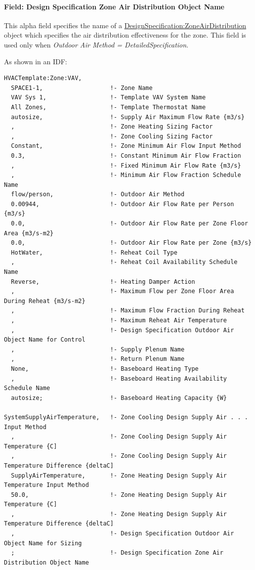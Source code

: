 \paragraph{Field: Design Specification Zone Air Distribution Object Name}\label{field-design-specification-zone-air-distribution-object-name-7}

This alpha field specifies the name of a \hyperref[designspecificationzoneairdistribution]{DesignSpecification:ZoneAirDistribution} object which specifies the air distribution effectiveness for the zone. This field is used only when \emph{Outdoor Air Method = DetailedSpecification}.

As shown in an IDF:

\begin{lstlisting}
HVACTemplate:Zone:VAV,
  SPACE1-1,                   !- Zone Name
  VAV Sys 1,                  !- Template VAV System Name
  All Zones,                  !- Template Thermostat Name
  autosize,                   !- Supply Air Maximum Flow Rate {m3/s}
  ,                           !- Zone Heating Sizing Factor
  ,                           !- Zone Cooling Sizing Factor
  Constant,                   !- Zone Minimum Air Flow Input Method
  0.3,                        !- Constant Minimum Air Flow Fraction
  ,                           !- Fixed Minimum Air Flow Rate {m3/s}
  ,                           !- Minimum Air Flow Fraction Schedule Name
  flow/person,                !- Outdoor Air Method
  0.00944,                    !- Outdoor Air Flow Rate per Person {m3/s}
  0.0,                        !- Outdoor Air Flow Rate per Zone Floor Area {m3/s-m2}
  0.0,                        !- Outdoor Air Flow Rate per Zone {m3/s}
  HotWater,                   !- Reheat Coil Type
  ,                           !- Reheat Coil Availability Schedule Name
  Reverse,                    !- Heating Damper Action
  ,                           !- Maximum Flow per Zone Floor Area During Reheat {m3/s-m2}
  ,                           !- Maximum Flow Fraction During Reheat
  ,                           !- Maximum Reheat Air Temperature
  ,                           !- Design Specification Outdoor Air Object Name for Control
  ,                           !- Supply Plenum Name
  ,                           !- Return Plenum Name
  None,                       !- Baseboard Heating Type
  ,                           !- Baseboard Heating Availability Schedule Name
  autosize;                   !- Baseboard Heating Capacity {W}

SystemSupplyAirTemperature,   !- Zone Cooling Design Supply Air . . . Input Method
  ,                           !- Zone Cooling Design Supply Air Temperature {C]
  ,                           !- Zone Cooling Design Supply Air Temperature Difference {deltaC]
  SupplyAirTemperature,       !- Zone Heating Design Supply Air Temperature Input Method
  50.0,                       !- Zone Heating Design Supply Air Temperature {C]
  ,                           !- Zone Heating Design Supply Air Temperature Difference {deltaC]
  ,                           !- Design Specification Outdoor Air Object Name for Sizing
  ;                           !- Design Specification Zone Air Distribution Object Name
\end{lstlisting}

